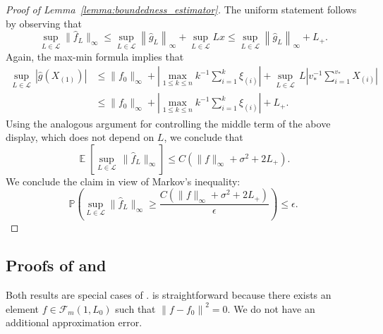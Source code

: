 \documentclass[12pt]{article}
\DeclareMathOperator*{\E}{\mathbb{E}}
\begin{document}
\begin{appendices}
\begin{proof}[Proof of Lemma~\ref{lemma:boundedness_estimator}]
The uniform statement follows by observing that 
\begin{equation*}
\sup _{L \in \mathcal{L}}\|\widehat{f}_L\|_{\infty} \leq \sup _{L \in \mathcal{L}}\left\|\widehat{g}_L\right\|_{\infty}+\sup _{L \in \mathcal{L}} L x \leq \sup _{L \in \mathcal{L}}\left\|\widehat{g}_L\right\|_{\infty}+L_{+} .
\end{equation*}
Again, the max-min formula implies that
\begin{align}
	\sup_{L\in\mathcal{L}}\, |\widehat g(X_{(1)})| &\le \|f_0\|_\infty +  \left|\max_{1\leq k \leq n}k^{-1}\sum_{i=1}^{k}\xi_{(i)} \right|  
    + \sup_{L\in\mathcal{L}}\,L \left|v^{-1}_*\sum_{i=1}^{v_*}X_{(i)}\right|\nonumber\\
    &\le \|f_0\|_\infty +  \left|\max_{1\leq k \leq n}k^{-1}\sum_{i=1}^{k}\xi_{(i)} \right| + L_+\nonumber.
\end{align}
Using the analogous argument for controlling the middle term of the above display, which does not depend on $L$, we conclude that 
\[\E\left[\sup_{L\in\mathcal{L}}\, \|\widehat f_{L}\|_\infty\right] \leq C( \|f\|_\infty + \sigma^2 + 2L_+).\]
We conclude the claim in view of Markov's inequality:
\begin{equation*}
\mathbb{P}\left(\sup _{L \in \mathcal{L}}\|\widehat{f}_L\|_{\infty} \geq \frac{C\left(\|f\|_{\infty}+\sigma^2+2 L_{+}\right)}{\epsilon}\right) \leq \epsilon.
\end{equation*}
\end{proof}

\subsection{Proofs of  and }\label{app: proof of isotonic cases}

Both results are special cases of .  is straightforward because there exists an element $f \in \mathcal{F}_m(1, L_0)$ such that $\left\|f-f_0\right\|^2 = 0$. We do not have an additional approximation error. 


\end{appendices}
\end{document}
